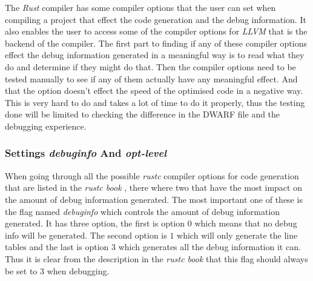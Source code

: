 

The \emph{Rust} compiler has some compiler options that the user can set when compiling a project that effect the code generation and the debug information.
It also enables the user to access some of the compiler options for \emph{LLVM} that is the backend of the compiler.
The first part to finding if any of these compiler options effect the debug information generated in a meaningful way is to read what they do and determine if they might do that.
Then the compiler options need to be tested manually to see if any of them actually have any meaningful effect.
And that the option doesn't effect the speed of the optimised code in a negative way.
This is very hard to do and takes a lot of time to do it properly, thus the testing done will be limited to checking the difference in the \gls{DWARF} file and the debugging experience.


\subsubsection{Settings \emph{debuginfo} And \emph{opt-level}}
When going through all the possible \emph{rustc} compiler options for code generation that are listed in the \emph{rustc book} \cite{rustc-book-codegen}, there where two that have the most impact on the amount of debug information generated.
The most important one of these is the flag named \emph{debuginfo} which controls the amount of debug information generated.
It has three option, the first is option $0$ which means that no debug info will be generated.
The second option is $1$ which will only generate the line tables and the last is option $3$ which generates all the debug information it can.
Thus it is clear from the description in the \emph{rustc book} that this flag should always be set to $3$ when debugging.


